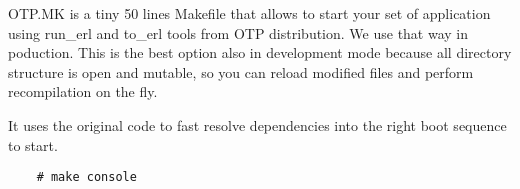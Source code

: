 OTP.MK is a tiny 50 lines Makefile that allows to start your set
of application using run\_erl and to\_erl tools from OTP distribution.
We use that way in poduction. This is the best option also in
development mode because all directory structure is open and mutable,
so you can reload modified files and perform recompilation on the fly.

It uses the original code to fast resolve dependencies into the right
boot sequence to start.

\vspace{1\baselineskip}
\begin{lstlisting}
    # make console
\end{lstlisting}
\vspace{1\baselineskip}

